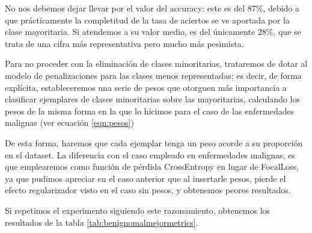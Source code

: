 No nos debemos dejar llevar por el valor del accuracy: este es del 87\%, debido a que prácticamente la completitud de la tasa de aciertos se ve aportada por la clase mayoritaria. Si atendemos a su valor medio, es del únicamente 28\%, que se trata de una cifra más representativa pero mucho más pesimista.

Para no proceder con la eliminación de clases minoritarias, trataremos de dotar al modelo de penalizaciones para las clases menos representadas; es decir, de forma explícita, estableceremos una serie de pesos que otorguen más importancia a clasificar ejemplares de clases minoritarias sobre las mayoritarias, calculando los pesos de la misma forma en la que lo hicimos para el caso de las enfermedades malignas (ver ecuación \ref{eqn:pesos})

De esta forma, haremos que cada ejemplar tenga un peso acorde a su proporción en el dataset. La diferencia con el caso empleado en enfermedades malignas, es que emplearemos como función de pérdida CrossEntropy en lugar de FocalLoss, ya que pudimos apreciar en el caso anterior que al insertarle pesos, pierde el efecto regularizador visto en el caso sin pesos, y obtenemos peores resultados.

Si repetimos el experimento siguiendo este razonamiento, obtenemos los resultados de la tabla \ref{tab:benignomalmejormetrics}.


